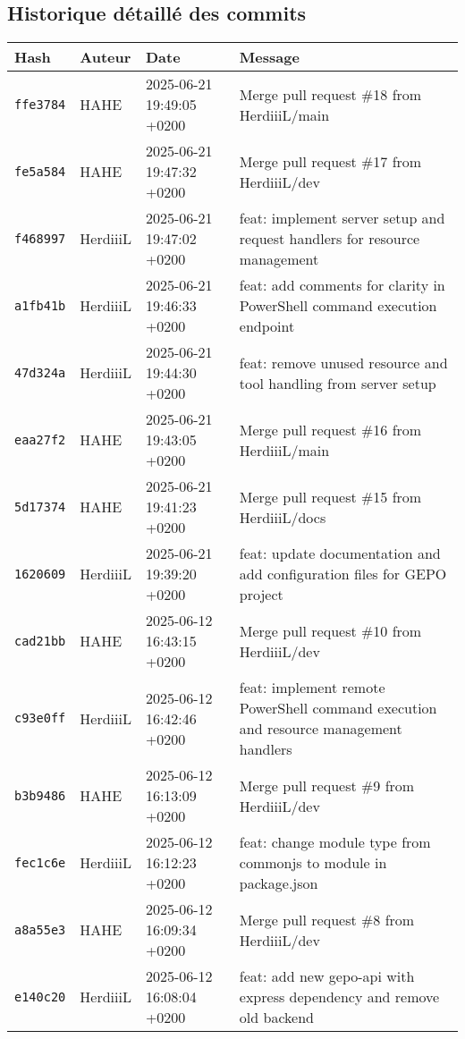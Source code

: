 \subsection*{Historique détaillé des commits}
\renewcommand{\arraystretch}{1.2}
\setlength{\LTpre}{0pt}
\setlength{\LTpost}{0pt}
\begin{longtable}{@{}p{2.5cm}p{3.5cm}p{3.5cm}p{7cm}@{}}
\toprule
\textbf{Hash} & \textbf{Auteur} & \textbf{Date} & \textbf{Message} \\
\midrule
\endhead
\texttt{ffe3784} & HAHE & 2025-06-21 19:49:05 +0200 & Merge pull request \#18 from HerdiiiL/main \\
\texttt{fe5a584} & HAHE & 2025-06-21 19:47:32 +0200 & Merge pull request \#17 from HerdiiiL/dev \\
\texttt{f468997} & HerdiiiL & 2025-06-21 19:47:02 +0200 & feat: implement server setup and request handlers for resource management \\
\texttt{a1fb41b} & HerdiiiL & 2025-06-21 19:46:33 +0200 & feat: add comments for clarity in PowerShell command execution endpoint \\
\texttt{47d324a} & HerdiiiL & 2025-06-21 19:44:30 +0200 & feat: remove unused resource and tool handling from server setup \\
\texttt{eaa27f2} & HAHE & 2025-06-21 19:43:05 +0200 & Merge pull request \#16 from HerdiiiL/main \\
\texttt{5d17374} & HAHE & 2025-06-21 19:41:23 +0200 & Merge pull request \#15 from HerdiiiL/docs \\
\texttt{1620609} & HerdiiiL & 2025-06-21 19:39:20 +0200 & feat: update documentation and add configuration files for GEPO project \\
\texttt{cad21bb} & HAHE & 2025-06-12 16:43:15 +0200 & Merge pull request \#10 from HerdiiiL/dev \\
\texttt{c93e0ff} & HerdiiiL & 2025-06-12 16:42:46 +0200 & feat: implement remote PowerShell command execution and resource management handlers \\
\texttt{b3b9486} & HAHE & 2025-06-12 16:13:09 +0200 & Merge pull request \#9 from HerdiiiL/dev \\
\texttt{fec1c6e} & HerdiiiL & 2025-06-12 16:12:23 +0200 & feat: change module type from commonjs to module in package.json \\
\texttt{a8a55e3} & HAHE & 2025-06-12 16:09:34 +0200 & Merge pull request \#8 from HerdiiiL/dev \\
\texttt{e140c20} & HerdiiiL & 2025-06-12 16:08:04 +0200 & feat: add new gepo-api with express dependency and remove old backend \\

\end{longtable}

